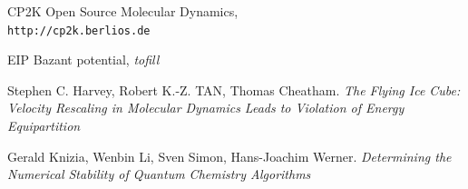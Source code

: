 \documentclass[aps,pre,twocolumn,showpacs,preprintnumbers,amsmath,amssymb]{revtex4-1}
\begin{document}
%

\begin{thebibliography}{10}

CP2K Open Source Molecular Dynamics,
\\\texttt{http://cp2k.berlios.de}

EIP Bazant potential,
\textit{tofill}

Stephen C. Harvey, Robert K.-Z. TAN, Thomas Cheatham. 
\textit{The Flying Ice Cube: Velocity Rescaling in Molecular Dynamics Leads to Violation of Energy Equipartition}

Gerald Knizia, Wenbin Li, Sven Simon, Hans-Joachim Werner. 
\textit{Determining the Numerical Stability of Quantum Chemistry Algorithms}


\end{thebibliography}

\end{document}
